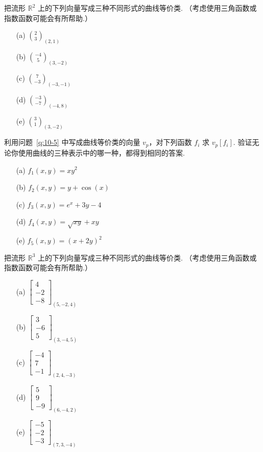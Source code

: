 \begin{question}\label{q:10-5}
把流形 $\mathbb{R}^2$ 上的下列向量写成三种不同形式的曲线等价类. （考虑使用三角函数或指数函数可能会有所帮助.）
\begin{enumerate}
  \item[(a)] $\binom{2}{3}_{(2,1)}$
  \item[(b)] $\binom{-4}{5}_{(3,-2)}$
  \item[(c)] $\binom{7}{-3}_{(-3,-1)}$
  \item[(d)] $\binom{-3}{-7}_{(-4,8)}$
  \item[(e)] $\binom{3}{1}_{(3,-2)}$
\end{enumerate}
\end{question}

\begin{question}\label{q:10-6}
利用问题~\ref{q:10-5} 中写成曲线等价类的向量 $v_p$，对下列函数 $f_i$ 求 $v_p[f_i]$. 验证无论你使用曲线的三种表示中的哪一种，都得到相同的答案.
\begin{enumerate}
  \item[(a)] $f_1(x,y)=xy^2$
  \item[(b)] $f_2(x,y)=y+\cos(x)$
  \item[(c)] $f_3(x,y)=e^x+3y-4$
  \item[(d)] $f_4(x,y)=\sqrt{xy}+xy$
  \item[(e)] $f_5(x,y)=(x+2y)^2$
\end{enumerate}
\end{question}

\begin{question}\label{q:10-7}
把流形 $\mathbb{R}^3$ 上的下列向量写成三种不同形式的曲线等价类. （考虑使用三角函数或指数函数可能会有所帮助.）
\begin{enumerate}
  \item[(a)] $\begin{bmatrix}4\\-2\\-8\end{bmatrix}_{(5,-2,4)}$
  \item[(b)] $\begin{bmatrix}3\\-6\\5\end{bmatrix}_{(3,-4,5)}$
  \item[(c)] $\begin{bmatrix}-4\\7\\-1\end{bmatrix}_{(2,4,-3)}$
  \item[(d)] $\begin{bmatrix}5\\9\\-9\end{bmatrix}_{(6,-4,2)}$
  \item[(e)] $\begin{bmatrix}-5\\-2\\-3\end{bmatrix}_{(7,3,-4)}$
\end{enumerate}
\end{question}

